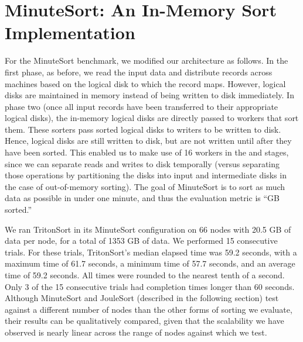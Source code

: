 \section{MinuteSort: An In-Memory Sort Implementation}
\label{sec:minutesort}

For the MinuteSort benchmark, we modified our architecture as follows. In the
first phase, as before, we read the input data and distribute records across
machines based on the logical disk to which the record maps. However, logical
disks are maintained in memory instead of being written to disk immediately.
In phase two (once all input records have been transferred to their appropriate
logical disks), the in-memory logical disks are directly passed to workers that
sort them. These sorters pass sorted logical disks to writers to be written to
disk. Hence, logical disks are still written to disk, but are not written until
after they have been sorted. This enabled us to make use of 16 workers in the
\reader and \writer stages, since we can separate reads and writes to disk
temporally (versus separating those operations by partitioning the disks into
input and intermediate disks in the case of out-of-memory sorting).  The goal
of MinuteSort is to sort as much data as possible in under one minute, and thus
the evaluation metric is ``GB sorted.''

We ran TritonSort in its MinuteSort configuration on 66 nodes with 20.5 GB of
data per node, for a total of 1353 GB of data. We performed 15 consecutive
trials.  For these trials, TritonSort's median elapsed time was 59.2 seconds,
with a maximum time of 61.7 seconds, a minimum time of 57.7 seconds, and an
average time of 59.2 seconds. All times were rounded to the nearest tenth of a
second.  Only 3 of the 15 consecutive trials had completion times longer than
60 seconds.  Although MinuteSort and JouleSort (described in the following
section) test against a different number of nodes than the other forms of
sorting we evaluate, their results can be qualitatively compared, given that
the scalability we have observed is nearly linear across the range of nodes
against which we test.
